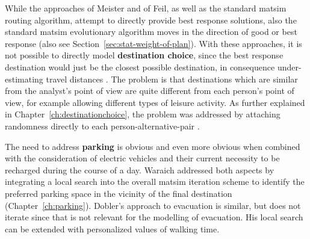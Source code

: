 While the approaches of Meister and of Feil, as well as the standard \gls{matsim} routing algorithm, attempt to directly provide best response solutions, also the standard \gls{matsim} evolutionary algorithm moves in the direction of good or best response (also see Section~\ref{sec:stat-weight-of-plan}).  With these approaches, it is not possible to directly model \textbf{destination choice}, since the best response destination would just be the closest possible destination, in consequence under-estimating travel distances \citep{HorniEtAl_TRR_2009}.  The problem is that destinations which are similar from the analyst's point of view are quite different from each person's point of view, for example allowing different types of leisure activity.  As further explained in Chapter~\ref{ch:destinationchoice}, the problem was addressed by attaching randomness directly to each person-alternative-pair \citep[also see][]{HorniEtAl_TRB_2012}.



%

The need to address \textbf{parking} is obvious and even more obvious when combined with the consideration of electric vehicles and their current necessity to be recharged during the course of a day. 
Waraich addressed both aspects by 
integrating a local search into the overall \gls{matsim} iteration scheme to identify the preferred parking space in the vicinity of the final destination (Chapter~\ref{ch:parking}). 
Dobler's approach \citep[][]{Dobler_PhDThesis_2013} to evacuation is similar, but 
does not iterate since that is not relevant for the modelling of evacuation.
His local search can be extended with personalized values of walking time.

